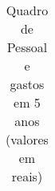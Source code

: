 \documentclass[12pt%
                    ]{report}
\begin{document}
\begin{longtable}[c]{%
	b{\gnumericColA}%
	b{\gnumericColB}%
	b{\gnumericColC}%
	b{\gnumericColD}%
	b{\gnumericColE}%
	b{\gnumericColF}%
	}

\caption[Quadro de Pessoal]{Quadro de Pessoal e gastos em 5 anos (valores em reais)}\label{tablePessoal} \\






\end{longtable}
\end{document}
